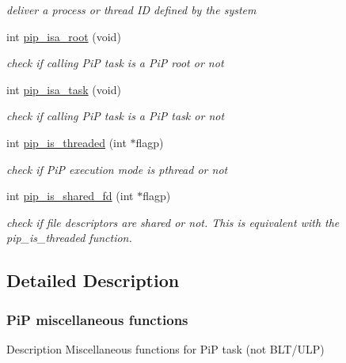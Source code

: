 \begin{DoxyCompactItemize}
\begin{DoxyCompactList}\small\item\em deliver a process or thread I\-D defined by the system \end{DoxyCompactList}\item 
int \hyperlink{group__pip-5-misc_ga6f1045bdbf682cb2ac504f09b57b73e9}{pip\-\_\-isa\-\_\-root} (void)
\begin{DoxyCompactList}\small\item\em check if calling Pi\-P task is a Pi\-P root or not \end{DoxyCompactList}\item 
int \hyperlink{group__pip-5-misc_gaf0283e47ad2d415206d6a3fa61e8a0a9}{pip\-\_\-isa\-\_\-task} (void)
\begin{DoxyCompactList}\small\item\em check if calling Pi\-P task is a Pi\-P task or not \end{DoxyCompactList}\item 
int \hyperlink{group__pip-5-misc_ga0455093d5040ae45585cc88a5f3f002b}{pip\-\_\-is\-\_\-threaded} (int $\ast$flagp)
\begin{DoxyCompactList}\small\item\em check if Pi\-P execution mode is pthread or not \end{DoxyCompactList}\item 
int \hyperlink{group__pip-5-misc_ga180ece8f3f537d84db8e70921f3ae099}{pip\-\_\-is\-\_\-shared\-\_\-fd} (int $\ast$flagp)
\begin{DoxyCompactList}\small\item\em check if file descriptors are shared or not. This is equivalent with the {\ttfamily pip\-\_\-is\-\_\-threaded} function. \end{DoxyCompactList}\end{DoxyCompactItemize}


\subsection{Detailed Description}
\hypertarget{pip-misc}{}\subsubsection{Pi\-P miscellaneous functions}\label{pip-misc}
\begin{DoxyParagraph}{Description}
Miscellaneous functions for Pi\-P task (not B\-L\-T/\-U\-L\-P) 
\end{DoxyParagraph}


